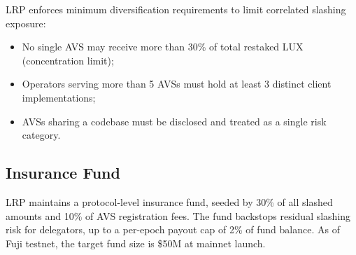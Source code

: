 LRP enforces minimum diversification requirements to limit correlated slashing exposure:

\begin{itemize}[leftmargin=1.5em]
  \item No single AVS may receive more than 30\% of total restaked LUX (concentration limit);
  \item Operators serving more than 5 AVSs must hold at least 3 distinct client implementations;
  \item AVSs sharing a codebase must be disclosed and treated as a single risk category.
\end{itemize}

\subsection{Insurance Fund}

LRP maintains a protocol-level insurance fund, seeded by 30\% of all slashed amounts and
10\% of AVS registration fees. The fund backstops residual slashing risk for delegators,
up to a per-epoch payout cap of 2\% of fund balance. As of Fuji testnet, the target fund
size is \$50M at mainnet launch.

